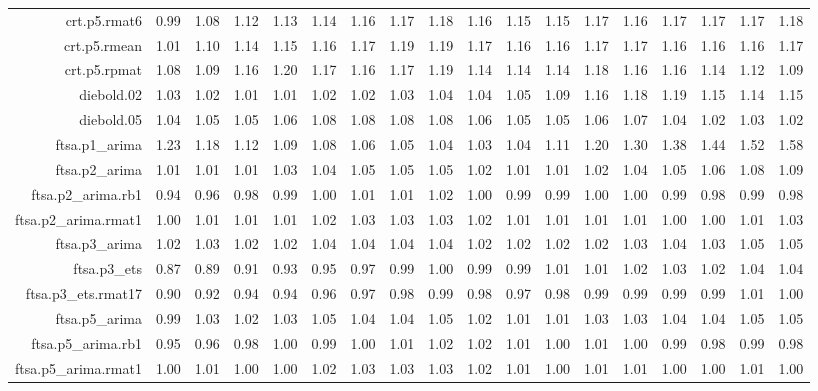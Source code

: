 \begin{tabular}{rrrrrrrrrrrrrrrrrr}
  crt.p5.rmat6 & 0.99 & 1.08 & 1.12 & 1.13 & 1.14 & 1.16 & 1.17 & 1.18 & 1.16 & 1.15 & 1.15 & 1.17 & 1.16 & 1.17 & 1.17 & 1.17 & 1.18 \\ 
  crt.p5.rmean & 1.01 & 1.10 & 1.14 & 1.15 & 1.16 & 1.17 & 1.19 & 1.19 & 1.17 & 1.16 & 1.16 & 1.17 & 1.17 & 1.16 & 1.16 & 1.16 & 1.17 \\ 
  crt.p5.rpmat & 1.08 & 1.09 & 1.16 & 1.20 & 1.17 & 1.16 & 1.17 & 1.19 & 1.14 & 1.14 & 1.14 & 1.18 & 1.16 & 1.16 & 1.14 & 1.12 & 1.09 \\ 
  diebold.02 & 1.03 & 1.02 & 1.01 & 1.01 & 1.02 & 1.02 & 1.03 & 1.04 & 1.04 & 1.05 & 1.09 & 1.16 & 1.18 & 1.19 & 1.15 & 1.14 & 1.15 \\ 
  diebold.05 & 1.04 & 1.05 & 1.05 & 1.06 & 1.08 & 1.08 & 1.08 & 1.08 & 1.06 & 1.05 & 1.05 & 1.06 & 1.07 & 1.04 & 1.02 & 1.03 & 1.02 \\ 
  ftsa.p1\_arima & 1.23 & 1.18 & 1.12 & 1.09 & 1.08 & 1.06 & 1.05 & 1.04 & 1.03 & 1.04 & 1.11 & 1.20 & 1.30 & 1.38 & 1.44 & 1.52 & 1.58 \\ 
  ftsa.p2\_arima & 1.01 & 1.01 & 1.01 & 1.03 & 1.04 & 1.05 & 1.05 & 1.05 & 1.02 & 1.01 & 1.01 & 1.02 & 1.04 & 1.05 & 1.06 & 1.08 & 1.09 \\ 
  ftsa.p2\_arima.rb1 & 0.94 & 0.96 & 0.98 & 0.99 & 1.00 & 1.01 & 1.01 & 1.02 & 1.00 & 0.99 & 0.99 & 1.00 & 1.00 & 0.99 & 0.98 & 0.99 & 0.98 \\ 
  ftsa.p2\_arima.rmat1 & 1.00 & 1.01 & 1.01 & 1.01 & 1.02 & 1.03 & 1.03 & 1.03 & 1.02 & 1.01 & 1.01 & 1.01 & 1.01 & 1.00 & 1.00 & 1.01 & 1.03 \\ 
  ftsa.p3\_arima & 1.02 & 1.03 & 1.02 & 1.02 & 1.04 & 1.04 & 1.04 & 1.04 & 1.02 & 1.02 & 1.02 & 1.02 & 1.03 & 1.04 & 1.03 & 1.05 & 1.05 \\ 
  ftsa.p3\_ets & 0.87 & 0.89 & 0.91 & 0.93 & 0.95 & 0.97 & 0.99 & 1.00 & 0.99 & 0.99 & 1.01 & 1.01 & 1.02 & 1.03 & 1.02 & 1.04 & 1.04 \\ 
  ftsa.p3\_ets.rmat17 & 0.90 & 0.92 & 0.94 & 0.94 & 0.96 & 0.97 & 0.98 & 0.99 & 0.98 & 0.97 & 0.98 & 0.99 & 0.99 & 0.99 & 0.99 & 1.01 & 1.00 \\ 
  ftsa.p5\_arima & 0.99 & 1.03 & 1.02 & 1.03 & 1.05 & 1.04 & 1.04 & 1.05 & 1.02 & 1.01 & 1.01 & 1.03 & 1.03 & 1.04 & 1.04 & 1.05 & 1.05 \\ 
  ftsa.p5\_arima.rb1 & 0.95 & 0.96 & 0.98 & 1.00 & 0.99 & 1.00 & 1.01 & 1.02 & 1.02 & 1.01 & 1.00 & 1.01 & 1.00 & 0.99 & 0.98 & 0.99 & 0.98 \\ 
  ftsa.p5\_arima.rmat1 & 1.00 & 1.01 & 1.00 & 1.00 & 1.02 & 1.03 & 1.03 & 1.03 & 1.02 & 1.01 & 1.00 & 1.01 & 1.01 & 1.00 & 1.00 & 1.01 & 1.00 \\ 

\end{tabular}
